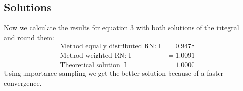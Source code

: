 \documentclass{article}
\begin{document}
\subsection*{Solutions}
Now we calculate the results for equation 3 with both solutions of the integral and round them:
\begin{align*}
\text{Method equally distributed RN: I} &= 0.9478\\
\text{Method weighted RN: I} &= 1.0091\\
\text{Theoretical solution: I} &= 1.0000
\end{align*}
Using importance sampling we get the better solution because of a faster convergence.
\end{document}
